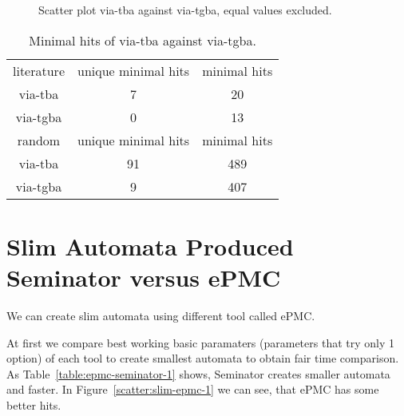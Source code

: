 \documentclass[
	digital,
nolof, nolot
]{fithesis3}
\begin{document}
		\begin{figure}[ht]
			\centering
			
		\caption{Scatter plot via-tba against via-tgba, equal values excluded. }
		\label{scatter:tba-tgba}
		\begin{tikzpicture}
			
		\end{tikzpicture}
		\end{figure}
		
		 
		\begin{table}[ht]
			
			\centering
			\caption{Minimal hits of via-tba against via-tgba.}
			\label{table:tba-tgba-min-hits}
			\begin{tabular}{ |c||c|c| } 
				\hline
				literature&unique minimal hits&minimal hits\\
				\hhline{|===|}
				via-tba&7 & 20\\
				\hline
				via-tgba&0 & 13\\ 
				\hline
				\hline
				random&unique minimal hits&minimal hits\\
				\hhline{|===|}
				via-tba&91 & 489\\
				\hline
				via-tgba&9 & 407\\ 
				\hline
			\end{tabular}
		\end{table}
	\clearpage
		\section{Slim Automata Produced Seminator versus ePMC}
		We can create slim automata using different tool called ePMC.
		
		At first we compare best working basic paramaters (parameters that try only 1 option) of each tool to create smallest automata to obtain fair time comparison.
		As Table~\ref{table:epmc-seminator-1} shows, Seminator creates smaller automata and faster. In Figure~\ref{scatter:slim-epmc-1} we can see, that ePMC has some better hits.
	
\end{document}
